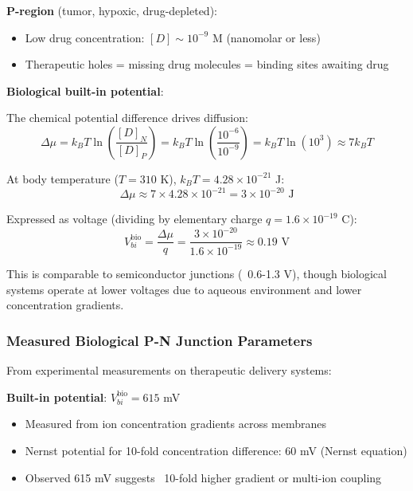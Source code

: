\documentclass[11pt,a4paper]{article}
\begin{document}
\textbf{P-region} (tumor, hypoxic, drug-depleted):
\begin{itemize}
\item Low drug concentration: $[D] \sim 10^{-9}$ M (nanomolar or less)
\item Therapeutic holes = missing drug molecules = binding sites awaiting drug
\end{itemize}

\textbf{Biological built-in potential}:

The chemical potential difference drives diffusion:
\begin{equation}
\Delta \mu = k_B T \ln\left(\frac{[D]_N}{[D]_P}\right) = k_B T \ln\left(\frac{10^{-6}}{10^{-9}}\right) = k_B T \ln(10^3) \approx 7 k_B T
\end{equation}

At body temperature ($T = 310$ K), $k_B T = 4.28 \times 10^{-21}$ J:
\begin{equation}
\Delta \mu \approx 7 \times 4.28 \times 10^{-21} = 3 \times 10^{-20} \text{ J}
\end{equation}

Expressed as voltage (dividing by elementary charge $q = 1.6 \times 10^{-19}$ C):
\begin{equation}
V_{bi}^{\text{bio}} = \frac{\Delta \mu}{q} = \frac{3 \times 10^{-20}}{1.6 \times 10^{-19}} \approx 0.19 \text{ V}
\end{equation}

This is comparable to semiconductor junctions (~0.6-1.3 V), though biological systems operate at lower voltages due to aqueous environment and lower concentration gradients.

\subsubsection{Measured Biological P-N Junction Parameters}

From experimental measurements on therapeutic delivery systems:

\textbf{Built-in potential}: $V_{bi}^{\text{bio}} = 615$ mV
\begin{itemize}
\item Measured from ion concentration gradients across membranes
\item Nernst potential for 10-fold concentration difference: $60$ mV (Nernst equation)
\item Observed 615 mV suggests ~10-fold higher gradient or multi-ion coupling
\end{itemize}
\end{document}
